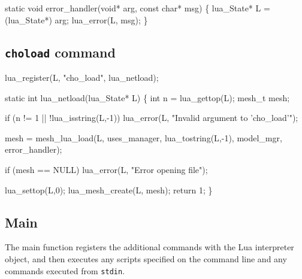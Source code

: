 \nwenddocs{}\endmoddef
static void error_handler(void* arg, const char* msg)
\{
    lua_State* L = (lua_State*) arg;
    lua_error(L, msg);
\}

\nwendcode{}\nwdocspar


\subsection{{\tt{}cho{}load} command}

\nwenddocs{}\endmoddef
lua_register(L, "cho_load", lua_netload);
\nwendcode{}\nwdocspar

\nwenddocs{}\plusendmoddef
static int lua_netload(lua_State* L)
\{
    int n = lua_gettop(L);
    mesh_t mesh;

    if (n != 1 || !lua_isstring(L,-1))
        lua_error(L, "Invalid argument to 'cho_load'");

    mesh = mesh_lua_load(L, uses_manager, lua_tostring(L,-1),
                         model_mgr, error_handler);

    if (mesh == NULL)
        lua_error(L, "Error opening file");

    lua_settop(L,0);
    lua_mesh_create(L, mesh);
    return 1;
\}

\nwendcode{}\nwdocspar


\subsection{Main}

The main function registers the additional commands with the
Lua interpreter object, and then executes any scripts specified
on the command line and any commands executed from {\tt{}stdin}.

